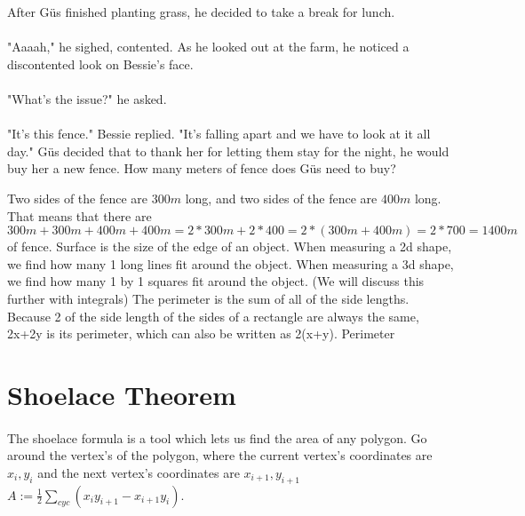 {}
{After Güs finished planting grass, he decided to take a break for lunch. \paragraph{} "Aaaah," he sighed, contented. As he looked out at the farm, he noticed a discontented look on Bessie's face. \paragraph{}"What's the issue?" he asked. \paragraph{} "It's this fence." Bessie replied. "It's falling apart and we have to look at it all day." Güs decided that to thank her for letting them stay for the night, he would buy her a new fence. How many meters of fence does Güs need to buy?}
{Two sides of the fence are $300 m$ long, and two sides of the fence are $400 m$ long. That means that there are $300 m + 300 m + 400 m + 400 m = 2\ast 300 m+ 2\ast 400 = 2\ast(300 m + 400m) = 2\ast 700 = 1400 m$ of fence.}
{Surface is the size of the edge of an object. When measuring a 2d shape, we find how many 1 long lines fit around the object. When measuring a 3d shape, we find how many 1 by 1 squares fit around the object. (We will discuss this further with integrals)
The perimeter is the sum of all of the side lengths. Because 2 of the side length of the sides of a rectangle are always the same, 2x+2y is its perimeter, which can also be written as 2(x+y).}
{Perimeter}
\section{Shoelace Theorem}
\paragraph{} The shoelace formula is a tool which lets us find the area of any polygon. Go around the vertex's of the polygon, where the current vertex's coordinates are $x_i, y_i$ and the next vertex's coordinates are $x_{i+1}, y_{i+1}$ \linebreak
$A:={\frac{1}{2}}\sum_{cyc} (x_iy_{i+1}-x_{i+1}y_i)$.